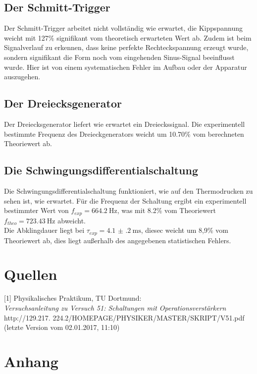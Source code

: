 \documentclass[]{scrartcl}
\let\oldsection\section
\renewcommand\section{\clearpage\oldsection}
\begin{document}
\subsection{Der Schmitt-Trigger}
Der Schmitt-Trigger arbeitet nicht vollständig wie erwartet, die Kippspannung weicht mit 127\% signifikant vom theoretisch erwarteten Wert ab. Zudem ist beim Signalverlauf zu erkennen, dass keine perfekte Rechteckspannung erzeugt wurde, sondern signifikant die Form noch vom eingehenden Sinus-Signal beeinflusst wurde. Hier ist von einem systematischen Fehler im Aufbau oder der Apparatur auszugehen.

\subsection{Der Dreiecksgenerator}
Der Dreiecksgenerator liefert wie erwartet ein Dreieckssignal. Die experimentell \\bestimmte Frequenz des Dreieckgenerators weicht um 10.70\% vom berechneten Theoriewert ab.

\subsection{Die Schwingungsdifferentialschaltung}
Die Schwingungsdifferentialschaltung funktioniert, wie auf den Thermodrucken zu sehen ist, wie erwartet. Für die Frequenz der Schaltung ergibt ein experimentell bestimmter Wert von $f_{exp}=\SI{664.2}{\hertz}$, was mit 8.2\% vom Theoriewert $f_{theo}=\SI{723.43}{\hertz}$ abweicht. \\
Die Abklingdauer liegt bei $\tau_{exp}=\SI{4.1(2)}{\milli\second}$, diesec weicht um 8,9\% vom Theoriewert ab, dies liegt außerhalb des angegebenen statistischen Fehlers.

\section{Quellen}
{[1]} Physikalisches Praktikum, TU Dortmund: \\
\textit{Versuchsanleitung zu Versuch 51: Schaltungen mit Operationsverstärkern}\\
http://129.217.
224.2/HOMEPAGE/PHYSIKER/MASTER/SKRIPT/V51.pdf (letzte Version vom 02.01.2017, 11:10)\\

\section{Anhang}
\end{document}
